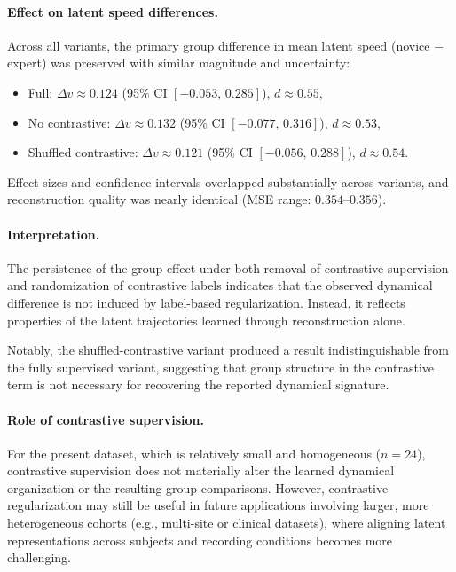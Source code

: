 \documentclass[5p,twocolumn,authoryear]{elsarticle}
\begin{document}
\paragraph{Effect on latent speed differences.}
Across all variants, the primary group difference in mean latent speed (novice $-$ expert) was preserved with similar magnitude and uncertainty:
\begin{itemize}
    \item Full: $\Delta v \approx 0.124$ \; (95\% CI $[-0.053,\,0.285]$), $d \approx 0.55$,
    \item No contrastive: $\Delta v \approx 0.132$ \; (95\% CI $[-0.077,\,0.316]$), $d \approx 0.53$,
    \item Shuffled contrastive: $\Delta v \approx 0.121$ \; (95\% CI $[-0.056,\,0.288]$), $d \approx 0.54$.
\end{itemize}

Effect sizes and confidence intervals overlapped substantially across variants, and reconstruction quality was nearly identical (MSE range: $0.354\text{--}0.356$).

\paragraph{Interpretation.}
The persistence of the group effect under both removal of contrastive supervision and randomization of contrastive labels indicates that the observed dynamical difference is not induced by label-based regularization. Instead, it reflects properties of the latent trajectories learned through reconstruction alone.

Notably, the shuffled-contrastive variant produced a result indistinguishable from the fully supervised variant, suggesting that group structure in the contrastive term is not necessary for recovering the reported dynamical signature.

\paragraph{Role of contrastive supervision.}
For the present dataset, which is relatively small and homogeneous ($n=24$), contrastive supervision does not materially alter the learned dynamical organization or the resulting group comparisons. However, contrastive regularization may still be useful in future applications involving larger, more heterogeneous cohorts (e.g., multi-site or clinical datasets), where aligning latent representations across subjects and recording conditions becomes more challenging.
\end{document}

